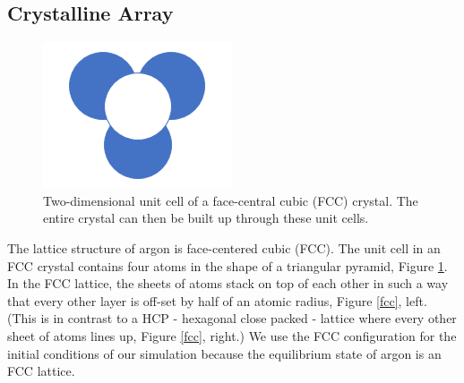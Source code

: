 \documentclass{article}
\begin{document}
\begin{multicols}{2}
\subsection{Crystalline Array}

\begin{figure}[H]
\begin{center}
\includegraphics[width=0.65\linewidth]{plots/crystal_structure.png}
\caption{Two-dimensional unit cell of a face-central cubic (FCC) crystal.  The entire crystal can then be built up through these unit cells.}
\label{unitcell}
\end{center}
\end{figure}

The lattice structure of argon is face-centered cubic (FCC).  The unit cell in an FCC crystal contains four atoms in the shape of a triangular pyramid, Figure \ref{unitcell}.  In the FCC lattice, the sheets of atoms stack on top of each other in such a way that every other layer is off-set by half of an atomic radius, Figure \ref{fcc}, left.  (This is in contrast to a HCP - hexagonal close packed - lattice where every other sheet of atoms lines up, Figure \ref{fcc}, right.)  \cite{crystal}  We use the FCC configuration for the initial conditions of our simulation because the equilibrium state of argon is an FCC lattice.  


\end{multicols}
\end{document}

